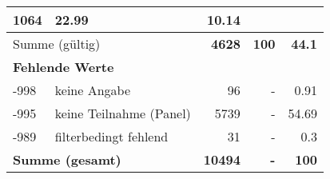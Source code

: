 \begin{longtable}{lXrrr}
       \num{1064} &
       \num[round-mode=places,round-precision=2]{22,99} &
         \num[round-mode=places,round-precision=2]{10,14} \\
     \midrule
     \multicolumn{2}{l}{Summe (gültig)} &
       \textbf{\num{4628}} &
     \textbf{100} &
       \textbf{\num[round-mode=places,round-precision=2]{44,1}} \\
     \multicolumn{5}{l}{\textbf{Fehlende Werte}}\\
       -998 &
       keine Angabe &
         \num{96} &
        - &
         \num[round-mode=places,round-precision=2]{0,91} \\
       -995 &
       keine Teilnahme (Panel) &
         \num{5739} &
        - &
         \num[round-mode=places,round-precision=2]{54,69} \\
       -989 &
       filterbedingt fehlend &
         \num{31} &
        - &
         \num[round-mode=places,round-precision=2]{0,3} \\
     \midrule
     \multicolumn{2}{l}{\textbf{Summe (gesamt)}} &
          \textbf{\num{10494}} &
        \textbf{-} &
        \textbf{100} \\
     \bottomrule
     \end{longtable}
     
